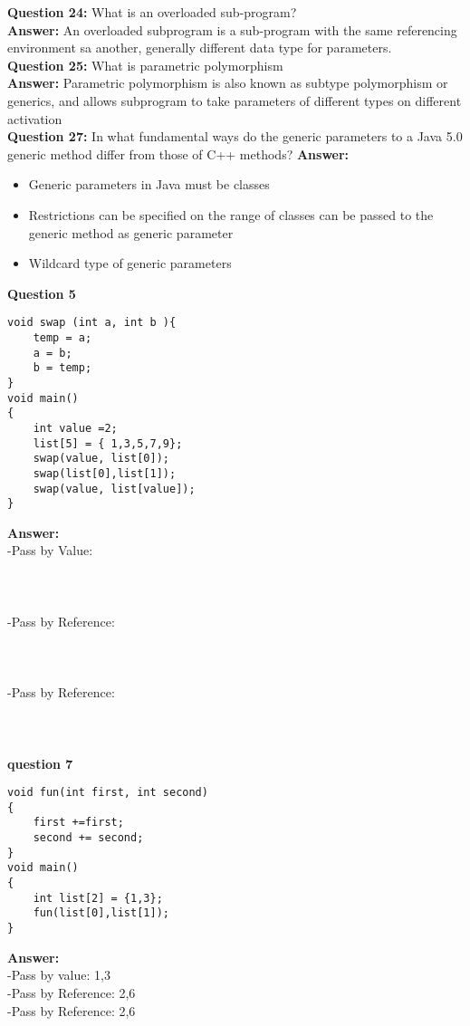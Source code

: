 \documentclass{article}
\begin{document}
\textbf{Question 24:} What is an overloaded sub-program?\\
\textbf{Answer: } An overloaded subprogram is a sub-program with the same referencing environment sa another, generally different data type for parameters.\\ 

\textbf{Question 25: } What is parametric polymorphism \\
\textbf{Answer: } Parametric polymorphism is also known as subtype polymorphism or generics, and allows subprogram to take parameters of different types on different activation\\

\textbf{Question 27: } In what fundamental ways do the generic parameters to a Java 5.0 generic method differ from those of C++ methods?
\textbf{Answer: } 
\begin{itemize}
\item Generic parameters in Java must be classes
\item Restrictions can be specified on the range of classes can be passed to the generic method as generic parameter
\item Wildcard type of generic parameters 
\end{itemize}

\textbf{Question 5}\\
\begin{lstlisting}
void swap (int a, int b ){
	temp = a;
	a = b;
	b = temp;
}
void main()
{
	int value =2;
	list[5] = { 1,3,5,7,9};
	swap(value, list[0]);
	swap(list[0],list[1]);
	swap(value, list[value]); 
}
\end{lstlisting}
\textbf{Answer: }\\
-Pass by Value: \\
\\
\\
\\
-Pass by Reference: \\
\\
\\
\\
-Pass by Reference: \\
\\
\\
\\

\textbf{question 7}
\begin{lstlisting}
void fun(int first, int second)
{
	first +=first;
	second += second;
}
void main()
{
	int list[2] = {1,3};
	fun(list[0],list[1]);
}
\end{lstlisting}
\textbf{Answer:}\\
-Pass by value: {1,3}\\
-Pass by Reference: {2,6}\\
-Pass by Reference: {2,6}\\
\indent {}
\end{document}
